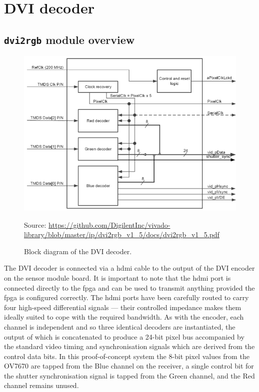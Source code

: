 \section{DVI decoder}

\subsection{\texttt{dvi2rgb} module overview}
\begin{figure}
  \centering
  \includegraphics[width=1\textwidth]{./img/dvi2rgb.png}\par
  Source: \url{https://github.com/DigilentInc/vivado-library/blob/master/ip/dvi2rgb_v1_5/docs/dvi2rgb_v1_5.pdf}
  \caption{Block diagram of the DVI decoder.}
  \label{fig:dvi2rgb}
\end{figure}

The DVI decoder is connected via a \gls{hdmi} cable to the output of the DVI encoder on the sensor module board. It is important to note that the \gls{hdmi} port is connected directly to the \gls{fpga} and can be used to transmit anything provided the \gls{fpga} is configured correctly. The \gls{hdmi} ports have been carefully routed to carry four high-speed differential signals --- their controlled impedance makes them ideally suited to cope with the required bandwidth. As with the encoder, each channel is independent and so three identical decoders are instantiated, the output of which is concatenated to produce a 24-bit pixel bus accompanied by the standard video timing and synchronisation signals which are derived from the control data bits. In this proof-of-concept system the 8-bit pixel values from the OV7670 are tapped from the Blue channel on the receiver, a single control bit for the shutter synchronisation signal is tapped from the Green channel, and the Red channel remains unused.

